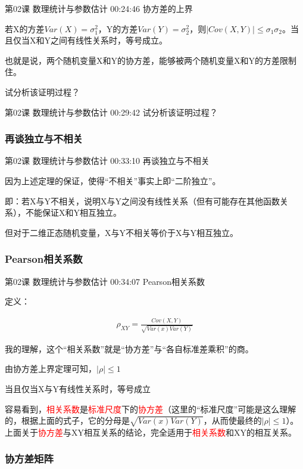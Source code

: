 \documentclass[UTF8]{ctexbook}
\begin{document}
第02课 数理统计与参数估计 00:24:46 协方差的上界

若X的方差$Var(X)=\sigma_{1}^{2}$，Y的方差$Var(Y)=\sigma_{2}^{2}$，则$|Cov(X,Y)| \leq \sigma_{1} \sigma_{2}$。当且仅当X和Y之间有线性关系时，等号成立。

也就是说，两个随机变量X和Y的协方差，能够被两个随机变量X和Y的方差限制住。

试分析该证明过程？

第02课 数理统计与参数估计 00:29:42 试分析该证明过程？

\subsubsection{再谈独立与不相关}

第02课 数理统计与参数估计 00:33:10 再谈独立与不相关

因为上述定理的保证，使得“不相关”事实上即“二阶独立”。

即：若X与Y不相关，说明X与Y之间没有线性关系（但有可能存在其他函数关系），不能保证X和Y相互独立。

但对于二维正态随机变量，X与Y不相关等价于X与Y相互独立。

\subsubsection{Pearson相关系数}

第02课 数理统计与参数估计 00:34:07 Pearson相关系数

定义：

\begin{equation}
\begin{aligned}
\rho_{XY}=\frac{Cov(X,Y)}{\sqrt{Var(x)Var(Y)}}
\end{aligned}
\end{equation}

我的理解，这个“相关系数”就是“协方差”与“各自标准差乘积”的商。

由协方差上界定理可知，$|\rho| \leq 1 $

当且仅当X与Y有线性关系时，等号成立

容易看到，\textcolor{red}{相关系数}是\textcolor{red}{标准尺度}下的\textcolor{red}{协方差}（这里的“标准尺度”可能是这么理解的，根据上面的式子，它的分母是$\sqrt{Var(x)Var(Y)}$，从而使最终的$|\rho| \leq 1 $）。上面关于\textcolor{red}{协方差}与XY相互关系的结论，完全适用于\textcolor{red}{相关系数}和XY的相互关系。

\subsubsection{协方差矩阵}
\end{document}
